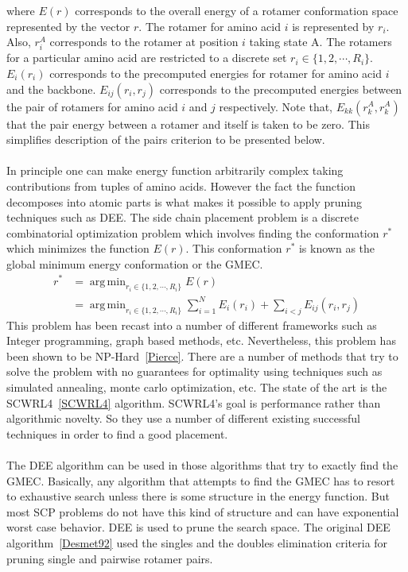 \documentclass{article}
\DeclareMathOperator*{\argmin}{arg\,min}
\begin{document}
where $E(r)$ corresponds to the overall energy of a rotamer conformation space represented by the vector $r$. The rotamer for amino acid $i$ is represented by $r_i$. Also, $r_i^A$ corresponds to the rotamer at position $i$ taking state A. The rotamers for a particular amino acid are restricted to a discrete set $r_i \in \{1,2,\cdots,R_i\}$. $E_i(r_i)$ corresponds to the precomputed energies for rotamer for amino acid $i$ and the backbone. $E_{ij}(r_i,r_j)$ corresponds to the precomputed energies between the pair of rotamers for amino acid $i$ and $j$ respectively. 
Note that, $E_{kk}(r_k^A,r_k^A)$ that the pair energy between a rotamer and itself is taken to be zero. This simplifies description of the pairs criterion to be presented below. 
\\
\\
In principle one can make energy function arbitrarily complex taking contributions from tuples of amino acids. However the fact the function decomposes into atomic parts is what makes it possible to apply pruning techniques such as DEE.  The side chain placement problem is a discrete combinatorial optimization problem which involves finding the conformation $r^*$ which minimizes the function $E(r)$. This conformation $r^*$ is known as the global minimum energy conformation or the GMEC.
\[
\begin{split}
r^* &= \argmin_{r_i \in \{1,2,\cdots,R_i\}} E(r) \\
&= \argmin_{r_i \in \{1,2,\cdots,R_i\}} \sum_{i=1}^{N}E_i(r_i) + \sum_{i<j}E_{ij}(r_i,r_j)
\end{split}
\]
This problem has been recast into a number of different frameworks such as Integer programming, graph based methods, etc. Nevertheless, this problem has been shown to be NP-Hard~\ref{Pierce}. There are a number of methods that try to solve the problem with no guarantees for optimality using techniques such as simulated annealing, monte carlo optimization, etc.  The state of the art is the SCWRL4~\ref{SCWRL4} algorithm. SCWRL4's goal is performance rather than algorithmic novelty. So they use a number of different existing successful techniques in order to find a good placement. 
\\
\\
The DEE algorithm can be used in those algorithms that try to exactly find the GMEC. Basically, any algorithm that attempts to find the GMEC has to resort to exhaustive search unless there is some structure in the energy function. But most SCP problems do not have this kind of structure and can have exponential worst case behavior. DEE is used to prune the search space. The original DEE algorithm~\ref{Desmet92} used the singles and the doubles elimination criteria for pruning single and pairwise rotamer pairs. 
\end{document}
